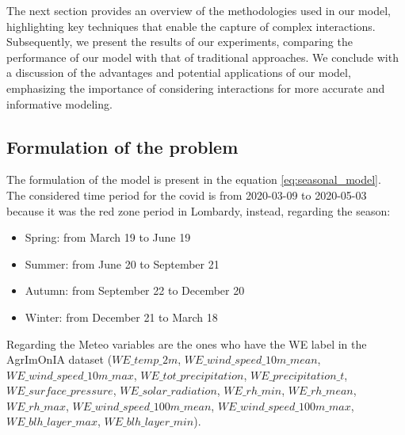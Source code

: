 \documentclass[10pt]{article} %
\begin{document}
    The next section provides an overview of the methodologies used in our model, highlighting key techniques that enable the capture of complex interactions. Subsequently, we present the results of our experiments, comparing the performance of our model with that of traditional approaches. We conclude with a discussion of the advantages and potential applications of our model, emphasizing the importance of considering interactions for more accurate and informative modeling.

    \subsection{Formulation of the problem}

    The formulation of the model is present in the equation \ref{eq:seasonal_model}.
    \\The considered time period \cite{lockdown} for the covid is from 2020-03-09 to 2020-05-03 because it was the red zone period in Lombardy, instead, regarding the season:
    \begin{itemize}
        \item Spring: from March 19 to June 19
        \item Summer: from June 20 to September 21
        \item Autumn: from September 22 to December 20
        \item Winter: from December 21 to March 18
    \end{itemize}

    Regarding the Meteo variables are the ones who have the WE label in the AgrImOnIA dataset ($WE\_temp\_2m$, $WE\_wind\_speed\_10m\_mean$, $WE\_wind\_speed\_10m\_max$, $WE\_tot\_precipitation$, $WE\_precipitation\_t$,
    $WE\_surface\_pressure$, $WE\_solar\_radiation$, $WE\_rh\_min$, $WE\_rh\_mean$, $WE\_rh\_max$, $WE\_wind\_speed\_100m\_mean$, $WE\_wind\_speed\_100m\_max$, $WE\_blh\_layer\_max$, $WE\_blh\_layer\_min$).
    
\end{document}
